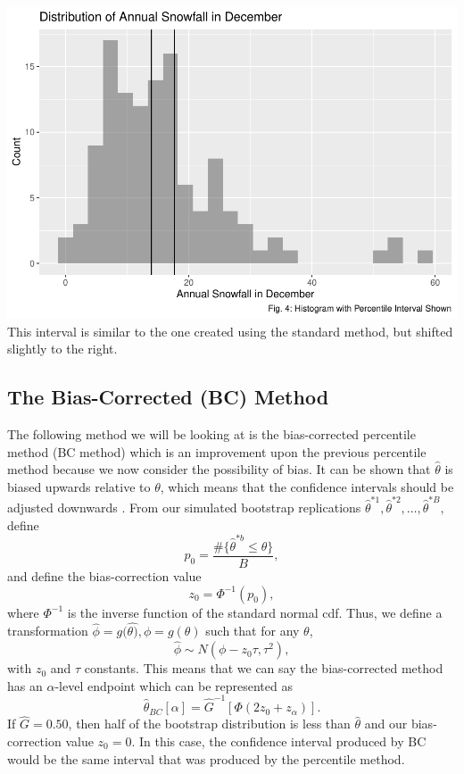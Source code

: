 \documentclass[12pt]{article}
\begin{document}
\includegraphics{paper_files/figure-latex/unnamed-chunk-5-1.pdf} This
interval is similar to the one created using the standard method, but
shifted slightly to the right.

\hypertarget{the-bias-corrected-bc-method}{%
\subsection{The Bias-Corrected (BC)
Method}\label{the-bias-corrected-bc-method}}

The following method we will be looking at is the bias-corrected
percentile method (BC method) which is an improvement upon the previous
percentile method because we now consider the possibility of bias. It
can be shown that \(\hat{\theta}\) is biased upwards relative to
\(\theta\), which means that the confidence intervals should be adjusted
downwards \citep[\citet{EfronCasi}]{Efron86}. From our simulated
bootstrap replications
\(\hat{\theta}^{*1}, \hat{\theta}^{*2}, \dots ,\hat{\theta}^{*B},\)
define \[p_0 = \frac{\#\{\hat{\theta}^{*b} \leq \theta\}}{B},\] and
define the bias-correction value \[z_0 = \Phi^{-1}(p_0),\] where
\(\Phi^{-1}\) is the inverse function of the standard normal cdf. Thus,
we define a transformation
\(\hat{\phi} = g(\hat{\theta)}, \phi = g(\theta)\) such that for any
\(\theta\), \[\hat{\phi} \sim N(\phi - z_0\tau, \tau^2),\] with \(z_0\)
and \(\tau\) constants. This means that we can say the bias-corrected
method has an \(\alpha\)-level endpoint which can be represented as
\[\hat{\theta}_{BC}[\alpha] = \hat{G}^{-1} \left [ \Phi \left ( 2z_0 + z_\alpha\right ) \right ].\]
If \(\hat{G} = 0.50\), then half of the bootstrap distribution is less
than \(\hat{\theta}\) and our bias-correction value \(z_0 = 0\). In this
case, the confidence interval produced by BC would be the same interval
that was produced by the percentile method.
\end{document}
